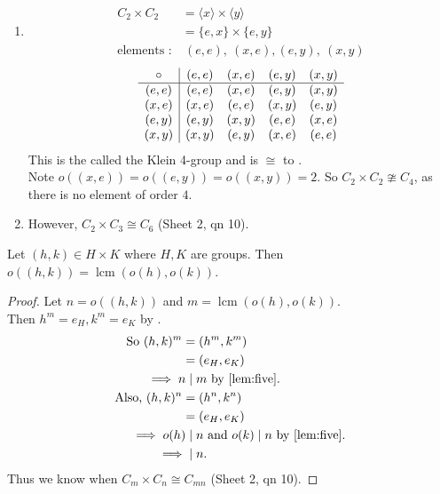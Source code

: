 \begin{example} ~\vspace*{-1.5\baselineskip}
  \begin{enumerate}
    \item 
      \begin{align*}
        C_2 \times C_2 &= \langle x \rangle \times \langle y \rangle \\
        &= \{ e, x \} \times \{e, y\} \\
        \text{elements :} &\ (e, e),\ (x, e), (e, y),\ (x, y)
      \end{align*} 
      \begin{align*}
        \begin{array}{c | cccc}
          \circ & (e, e) & (x, e) & (e, y) & (x, y) \\
          \hline
          (e, e) & (e, e) & (x, e) & (e, y) & (x, y) \\
          (x, e) & (x, e) & (e, e) & (x, y) & (e, y) \\
          (e, y) & (e, y) & (x, y) & (e, e) & (x, e) \\
          (x, y) & (x, y) & (e, y) & (x, e) & (e, e)
        \end{array}
      \end{align*} 
      This is the called the Klein 4-group and is $\cong$ to .\\
      Note $o\left( (x, e) \right) = o\left( (e, y) \right) = o\left( (x, y) \right) = 2$. So $C_2 \times C_2 \ncong C_4$, as there is no element of order $4$.
    \item However, $C_2 \times C_3 \cong C_6$ (Sheet 2, qn 10).
  \end{enumerate} 
\end{example} 

\begin{lemma}
    Let $(h, k) \in H \times K$ where $H, K$ are groups. 
    Then $o\left( (h, k) \right) = \operatorname{lcm} \left( o(h), o(k) \right)$.
\end{lemma} 

\begin{proof}
  Let $n = o\left( (h, k) \right)$ and $m = \operatorname{lcm} \left( o(h), o(k) \right)$.\\
  Then $h^m = e_H, k^m = e_K$ by .
  \begin{align*}
    \text{So } (h, k)^m &= (h^m, k^m) \\
    &= (e_H, e_K) \\
    \implies n \mkern-5mu &\;\mid m \text{ by \Cref{lem:five}}. \\
    \text{Also, } (h, k)^n &= (h^n, k^n) \\
    &= (e_H, e_K) \\
    \implies o(h) \mkern-5mu &\;\mid n \text{ and } o(k) \mid n \text{ by \Cref{lem:five}}. \\
    \implies \mkern-5mu &\;\mid n.
  \end{align*} 
  Thus we know when $C_m \times C_n \cong C_{mn}$ (Sheet 2, qn 10).
\end{proof} 

